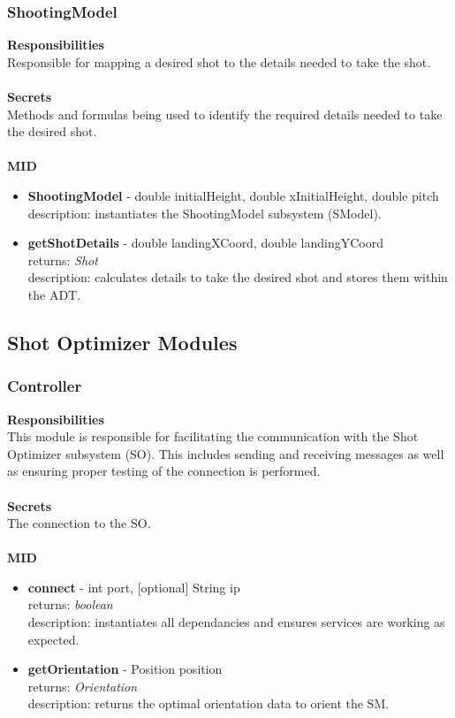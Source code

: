 \documentclass[11pt]{article}
\begin{document}
\subsubsection*{ShootingModel}
\textbf{Responsibilities} \\
Responsible for mapping a desired shot to the details needed to take the shot. \\ \\
\textbf{Secrets} \\ 
Methods and formulas being used to identify the required details needed to take the desired shot. \\  \\
\textbf{MID} 
\begin{itemize}
\item \textbf{ShootingModel} - double initialHeight, double xInitialHeight, double pitch \\ description: instantiates the ShootingModel subsystem (SModel).
\item \textbf{getShotDetails} - double landingXCoord, double landingYCoord \\ returns: \textit{Shot} \\ description: calculates details to take the desired shot and stores them within the ADT.
\end{itemize}

\subsection{Shot Optimizer Modules}
\subsubsection*{Controller}
\textbf{Responsibilities} \\
This module is responsible for facilitating the communication with the Shot Optimizer subsystem (SO). This includes sending and receiving messages as well as ensuring proper testing of the connection is performed. \\ \\
\textbf{Secrets} \\ 
The connection to the SO. \\ \\
\textbf{MID} 
\begin{itemize}
\item \textbf{connect} - int  port, [optional] String ip \\ returns: \textit{boolean} \\ description: instantiates all dependancies and ensures services are working as expected.
\item \textbf{getOrientation} - Position  position \\ returns: \textit{Orientation} \\ description: returns the optimal orientation data to orient the SM.
\end{itemize}
\end{document}
